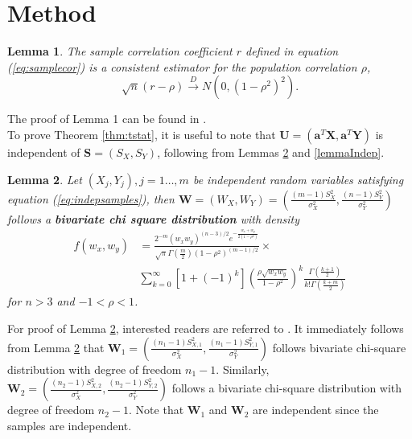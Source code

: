 \documentclass[12pt, a4paper]{article}
\newtheorem{lemma}{Lemma}
\begin{document}
	
	
	
	
	
	\section{Method}\label{section:testcormethod}
	
	\begin{lemma}
		The sample correlation coefficient $r$ defined in equation (\ref{eq:samplecor}) is a consistent estimator for the population correlation $\rho$, 
		\[\sqrt{n}(r - \rho ) \stackrel{D}{\rightarrow}N\left(0, (1-\rho^2)^2\right).\]
	\end{lemma}
	The proof of Lemma 1 can be found in \citet{fisher1915frequency}. \\
	
	To prove Theorem \ref{thm:tstat}, it is useful to note that $\bm U = (\bm a^T\bm X, \bm a^T\bm Y)$ is independent of $\bm S = (S_X, S_Y)$,
	following from Lemmas \ref{lemmabiChisq} and \ref{lemmaIndep}.
	\begin{lemma}\label{lemmabiChisq}
		Let $(X_{j}, Y_{j}), j=1 \ldots,  m$ be independent random variables satisfying equation 
		(\ref{eq:indepsamples}),
		then $\bm W = (W_{X},W_{Y}) =(\frac{(m -1)S_{X}^2}{\sigma_X^2}, 
		\frac{(n-1)S_{Y}^2}{\sigma_Y^2})$ 
		follows a \textbf{bivariate chi square distribution} with density 
		\begin{equation}\label{biChisq}
			\begin{aligned}
				f(w_x, w_y) & = \frac{2^{-m}(w_xw_y)^{(n-3)/2}e^{-\frac{w_x +
							w_y}{2(1-\rho^2)}}}{\sqrt{\pi}\Gamma(\frac{m}{2})(1-\rho^2)^{(m-1)/2}} 
							\times \\
				& \sum_{k=0}^{\infty}[1 +
				(-1)^k]\left(\frac{\rho\sqrt{w_xw_y}}{1-\rho^2}\right)^k\frac{\Gamma(\frac{k+1}{2})}{k!\Gamma(\frac{k+
				 m}{2})}
			\end{aligned}
		\end{equation}
		for $n>3$ and $-1<\rho < 1$.
	\end{lemma}
	For proof of Lemma \ref{lemmabiChisq}, interested readers are referred to \citet{joarder2009moments}.
	It immediately follows from Lemma \ref{lemmabiChisq} that $\bm W_1 = (\frac{(n_1 -1)S_{X, 1}^2}{\sigma_X^2}, \frac{(n_1-1)S_{Y, 1}^2}{\sigma_Y^2})$ follows bivariate chi-square distribution with degree of freedom $n_1-1$. Similarly, $\bm W_2 =(\frac{(n_2 -1)S_{X, 2}^2}{\sigma_X^2}, \frac{(n_2-1)S_{Y, 2}^2}{\sigma_Y^2})$ follows a bivariate chi-square distribution with degree of freedom $n_2-1$.  Note that $\bm W_1$ and $\bm W_2$ are independent since the samples are independent. 
	
\end{document}
